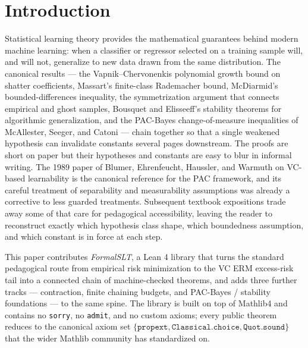 \documentclass[sigplan,anonymous,review,screen]{acmart}
\begin{document}
\maketitle

\section{Introduction}
\label{sec:intro}

Statistical learning theory provides the mathematical guarantees behind
modern machine learning: when a classifier or regressor selected on a
training sample will, and will not, generalize to new data drawn from
the same distribution. The canonical results --- the
Vapnik--Chervonenkis polynomial growth bound on shatter coefficients,
Massart's finite-class Rademacher bound, McDiarmid's bounded-differences
inequality, the symmetrization argument that connects empirical and
ghost samples, Bousquet and Elisseeff's stability theorems for
algorithmic generalization, and the PAC-Bayes change-of-measure
inequalities of McAllester, Seeger, and Catoni --- chain together so
that a single weakened hypothesis can invalidate constants several
pages downstream. The proofs are short on paper but their hypotheses
and constants are easy to blur in informal writing. The 1989 paper of Blumer,
Ehrenfeucht, Haussler, and Warmuth on VC-based learnability
\cite{Blumer1989} is the canonical reference for the
PAC framework, and its careful treatment of separability and
measurability assumptions was already a corrective to less guarded
treatments. Subsequent textbook expositions
\cite{ShalevShwartz2014, BoucheronLugosiMassart2013}
trade away some of that care for pedagogical accessibility, leaving the
reader to reconstruct exactly which hypothesis class shape, which
boundedness assumption, and which constant is in force at each step.

This paper contributes \emph{FormalSLT}, a Lean 4 library that turns
the standard pedagogical route from empirical risk minimization to the
VC ERM excess-risk tail into a connected chain of machine-checked
theorems, and adds three further tracks --- contraction, finite chaining
budgets, and PAC-Bayes / stability foundations --- to the same spine.
The library is built on top of Mathlib4 and contains no \texttt{sorry},
no \texttt{admit}, and no custom axioms; every public theorem reduces
to the canonical axiom set $\{\texttt{propext},
\texttt{Classical.choice}, \texttt{Quot.sound}\}$ that the wider
Mathlib community has standardized on.
\end{document}
